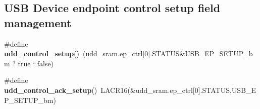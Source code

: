 \subsection*{U\-S\-B Device endpoint control setup field management}
\begin{DoxyCompactItemize}
\item 
\hypertarget{group__udd__xmega__usb__group_ga8509d5cc41d521cb43159a80ac260254}{\#define {\bfseries udd\-\_\-control\-\_\-setup}()~(udd\-\_\-sram.\-ep\-\_\-ctrl\mbox{[}0\mbox{]}.S\-T\-A\-T\-U\-S\&U\-S\-B\-\_\-\-E\-P\-\_\-\-S\-E\-T\-U\-P\-\_\-bm ? true \-: false)}\label{group__udd__xmega__usb__group_ga8509d5cc41d521cb43159a80ac260254}

\item 
\hypertarget{group__udd__xmega__usb__group_gac0b743d67f36aeb81c4724cd87162f3e}{\#define {\bfseries udd\-\_\-control\-\_\-ack\-\_\-setup}()~L\-A\-C\-R16(\&udd\-\_\-sram.\-ep\-\_\-ctrl\mbox{[}0\mbox{]}.S\-T\-A\-T\-U\-S,U\-S\-B\-\_\-\-E\-P\-\_\-\-S\-E\-T\-U\-P\-\_\-bm)}\label{group__udd__xmega__usb__group_gac0b743d67f36aeb81c4724cd87162f3e}

\end{DoxyCompactItemize}
